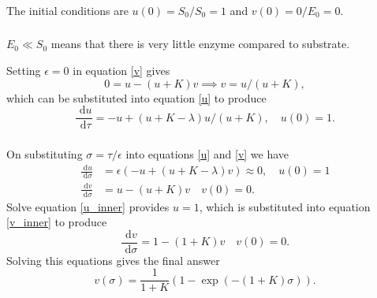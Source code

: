 \documentclass[]{article}
\newcommand{\bb}{\begin{equation}}
\newcommand{\ee}{\end{equation}}
\newcommand{\rd}{\text{ d}}
\newcommand{\eqn}[1]{equation \eqref{#1}}
\newcommand{\eqns}[2]{equations \eqref{#1} and \eqref{#2}}
\renewcommand{\l}{\left(}
\renewcommand{\r}{\right)}
\begin{document}
\begin{Answ}
\subsubsection{}
The initial conditions are $u(0)=S_0/S_0=1$ and $v(0)=0/E_0=0$.
\subsubsection{}
$E_0\ll S_0$ means that there is very little enzyme compared to substrate.

Setting $\epsilon=0$ in \eqn{v} gives
\bb
0=u-(u+K)v\implies v=u/(u+K),
\ee
which can be substituted into \eqn{u} to produce
\bb
\frac{\rd u}{\rd \tau}=-u+(u+K-\lambda)u/(u+K),\quad u(0)=1.\ee
\subsubsection{}
On substituting $\sigma=\tau/\epsilon$ into \eqns{u}{v} we have 
\begin{align}
\frac{\rd u}{\rd \sigma}&=\epsilon\l-u+(u+K-\lambda)v\r\approx 0,\quad u(0)=1\label{u_inner}\\
\frac{\rd v}{\rd \sigma}&=u-(u+K)v\quad v(0)=0.\label{v_inner}
\end{align}
Solve \eqn{u_inner} provides $u=1$, which is substituted into \eqn{v_inner} to produce
\bb
\frac{\rd v}{\rd \sigma}=1-(1+K)v\quad v(0)=0.
\ee
Solving this equations gives the final answer
\bb
v(\sigma)= \frac{1}{1+K}\l 1-\exp(-(1+K)\sigma)\r.
\ee

\end{Answ}
\end{document}
